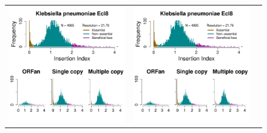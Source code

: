 \documentclass[a4paper,10pt, twocolumn]{article}
\begin{document}
\begin{figure}
\begin{tabular}{c c c}
\includegraphics[page=7, scale=0.28]{per-species-insertion-index.pdf} &
\includegraphics[page=8, scale=0.28]{per-species-insertion-index.pdf} &

\end{tabular}
\end{figure}
\end{document}
